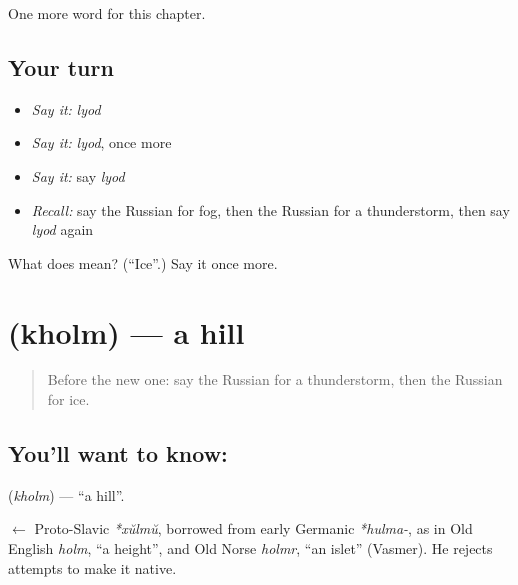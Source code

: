 \begin{grammarlens}[title={What you've built}]
One more word for this chapter.
\end{grammarlens}

\subsection*{Your turn}
\begin{itemize}
\raggedright
  \item \emph{Say it:} \emph{lyod}
  \item \emph{Say it:} \emph{lyod}, once more
  \item \emph{Say it:} say \emph{lyod}
  \item \emph{Recall:} say the Russian for fog, then the Russian for a thunderstorm, then say \emph{lyod} again
\end{itemize}

\begin{tcolorbox}[breakable,colback=teal!4,colframe=teal!35!black,title={Before you move on}]
What does  mean? (\textquotedblleft{}Ice\textquotedblright{}.) Say it once more.
\end{tcolorbox}
\section[\texorpdfstring{\ru{холм} (kholm)}{холм (kholm)}]{ (kholm) — a hill}

\label{lesson:RU-C115-hill}



\begin{quote}
Before the new one: say the Russian for a thunderstorm, then the Russian for ice.
\end{quote}

\subsection*{You'll want to know: }
\textbf{} (\emph{kholm}) — \textquotedblleft{}a hill\textquotedblright{}.

\begin{cousinweb}
\textbf{} $\leftarrow$ Proto-Slavic \emph{*xŭlmŭ}, borrowed from early Germanic \emph{*hulma-}, as in Old English \emph{holm}, \textquotedblleft{}a height\textquotedblright{}, and Old Norse \emph{holmr}, \textquotedblleft{}an islet\textquotedblright{} (Vasmer). He rejects attempts to make it native.
\end{cousinweb}

